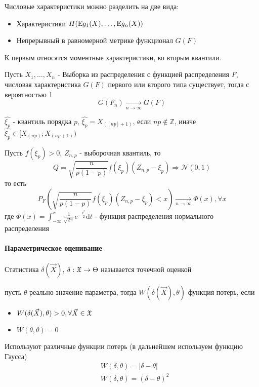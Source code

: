 \documentclass[main.tex]{subfiles}
\begin{document}
Числовые характеристики можно разделить на две вида:
\begin{itemize}
	\item Характеристики $H(\mathrm{E} g_1(X), \dots, \mathrm{E} g_n(X))$
	\item Непрерывный в равномерной метрике функционал $G(F)$
\end{itemize}
К первым относятся моментные характеристики, ко вторым квантили.
\begin{theorem}
	Пусть $X_1,\dots,X_n$ - Выборка из распределения с функцией распределения $F$, числовая характеристика $G(F)$ первого или второго типа существует, тогда с вероятностью 1
	$$G(F_n) \underset{n\rightarrow\infty}{\rightarrow}G(F)$$
\end{theorem}

\begin{definition}
	$\hat{\xi_p}$ - квантиль порядка $p$, $\hat{\xi_{p}}=X_{([np]+1)}$, если $np\notin\mathbb{Z}$, иначе $\hat{\xi_{p}}\in [X_{(np)};X_{(np+1)})$
\end{definition}

\begin{theorem}
	Пусть $f(\xi_p)>0$, $Z_{n,p}$ - выборочная квантиль, то $$Q=\sqrt{\frac{n}{p(1-p)}}f(\xi_p)(Z_{n,p} - \xi_p) \Rightarrow \mathcal{N}(0,1)$$ то есть $$ P_F(\sqrt{\frac{n}{p(1-p)}}f(\xi_p)(Z_{n,p} - \xi_p) < x) \underset{n\rightarrow\infty}{\rightarrow} \Phi(x), \forall x$$
	где $\Phi(x) = \int_{-\infty}^{x}\frac{1}{\sqrt{2\pi}}e^{-\frac{t^2}{2}}\mathrm{d}t$ - функция распределения нормального распределения
\end{theorem}

\paragraph{Параметрическое оценивание}
\begin{definition}
	Статистика $\delta ( \vec{X} )$, $\delta : \mathfrak{X} \rightarrow \Theta$ называется точечной оценкой
\end{definition}

\begin{definition}
	пусть $\theta$ реально значение параметра, тогда $W(\delta (\vec{X}),\theta)$ функция потерь, если
	\begin{itemize}
	 	\item $W(\delta (\vec{X}),\theta)>0,\forall \vec{X} \in \mathfrak{X}$
	 	\item $W(\theta,\theta)=0$
	 \end{itemize} 
\end{definition}
Используют различные функции потерь (в дальнейшем используем функцию Гаусса)
\begin{align}
	& W(\delta,\theta)=|\delta-\theta| \tag{Лаплас} \\
	& W(\delta,\theta)=(\delta-\theta)^2 \tag{Гаусс}
\end{align}
\end{document}

